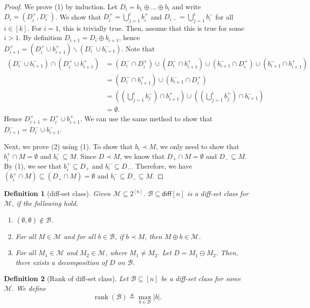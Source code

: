 \documentclass{article}
\newtheorem{define}{Definition}
\newcommand{\M}{\mathcal M}
\newcommand{\diff}{\mathsf{diff}}
\newcommand{\diffvalid}{\prec}
\newcommand{\B}{\mathcal B}
\newcommand{\del}{\backslash}
\DeclareMathOperator{\rank}{rank}
\begin{document}
\begin{spacing}{1.1}
\begin{proof}
We prove (1) by induction.
Let $D_i = b_1 \oplus \ldots \oplus b_i$ and write $D_i=(D_i^+, D_i^-)$.
We show that $D_i^+=\bigcup_{j=1}^i b_i^+$ and $D_{i-}=\bigcup_{j=1}^i b_i^-$ for all $i\in[k]$.
For $i=1$, this is trivially true.
Then, assume that this is true for some $i>1$.
By definition $D_{i+1}=D_{i}\oplus b_{i+1}$, hence $D_{i+1}^+=(D_i^+ \cup b_{i+1}^+)\del(D_i^- \cup b_{i+1}^-)$.
Note that 
\begin{align*}
(D_i^-\cup b_{i+1}^-)\cap(D_i^+ \cup b_{i+1}^+) &= (D_i^-\cap D_i^+)\cup(D_i^- \cap b_{i+1}^+)\cup(b_{i+1}^- \cap D_i^+)\cup(b_{i+1}^- \cap b_{i+1}^+)\\
		&= (D_i^- \cap b_{i+1}^+) \cup (b_{i+1}^- \cap D_i^+) \\
		&= \left(\left(\bigcup_{j=1}^i b_{j}^-\right) \cap b_{i+1}^+ \right) \cup \left(\left(\bigcup_{j=1}^i b_{j}^+\right) \cap b_{i+1}^- \right)\\
		&= \emptyset.
\end{align*}
Hence $D_{i+1}^+=D_i^+ \cup b_{i+1}^+$. We can use the same method to show that $D_{i+1}^-=D_i^- \cup b_{i+1}^-$.

Next, we prove (2) using (1).
To show that $b_i\diffvalid M$, we only need to show that $b_i^+ \cap M = \emptyset$ and $b_i^- \subseteq M$.
Since $D\diffvalid M$, we know that $D_+\cap M=\emptyset$ and $D_-\subseteq M$.
By (1), we see that $b_i^+\subseteq D_+$ and $b_i^-\subseteq D_-$.
Therefore, we have $(b_i^+\cap M) \subseteq (D_+\cap M) = \emptyset$ and $b_i^-\subseteq D_- \subseteq M$.

\end{proof}


\begin{define}[diff-set class]
\label{define:diff-class}
Given $\M \subseteq 2^{[n]}$. $\B \subseteq \diff[n]$ is a diff-set class for $\M$, if the following hold.
\begin{enumerate} 
\item $(\emptyset,\emptyset)\not\in \B$.
\item For all $M\in \M$ and for all $b\in \B$, if $b\diffvalid M$, then $M\oplus b \in \M$.
\item For all $M_1 \in \M$ and $M_2\in \M$, where $M_1\not=M_2$. 	
	  Let $D=M_1\ominus M_2$.  
	  Then, there exists a decomposition of $D$ on $\B$.
\end{enumerate}
\end{define}

\begin{define}[Rank of diff-set class]
Let $\B \subseteq [n]$ be a diff-set class for some $\M$. We define
$$
\rank(\B) \triangleq \max_{b \in \B} |b|.
$$
\end{define}


\end{spacing}
\end{document}
